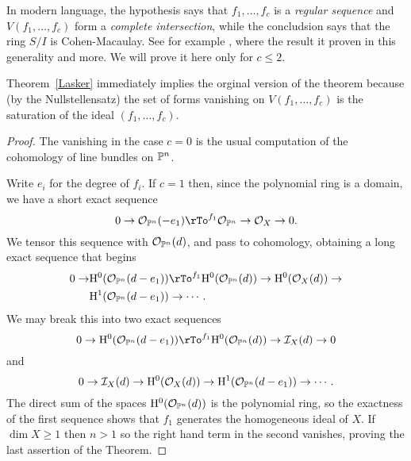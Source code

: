\documentclass[12pt, leqno]{book}
\begin{document}
In modern language, the hypothesis says that $f_{1}, \dots, f_{c}$ is a \emph{regular sequence} and $V(f_{1},\dots,f_{c})$ form a \emph{complete intersection}, while the concludsion says that the ring $S/I$ is Cohen-Macaulay. See for example \cite[Chapter 18]{Eisenbud95}, where the result it proven in this generality and more.
We will prove it here only for $c\leq 2$.

Theorem~\ref{Lasker} immediately implies the orginal version of the theorem because (by the Nullstellensatz) the set of forms vanishing on $V(f_{1}, \dots, f_{c})$ is the saturation 
of the ideal $(f_{1}, \dots, f_{c})$. 

\begin{proof} The vanishing in the case $c=0$ is the usual computation of the cohomology of line bundles on $\PP^{n}$.

Write $e_{i}$ for the degree of $f_{i}$. If $c = 1$ then, since the polynomial ring is a domain, we have a short exact sequence
$$
0\to \cO_{\PP^{n}}(-e_{1}) \rTo^{f_{1}}  \cO_{\PP^{n}} \to  \cO_{X}\to 0.
$$
We tensor this sequence with $\cO_{\PP^{n}}(d)$, and pass to cohomology, obtaining a long exact sequence that begins
\begin{align*}
0\to &\HH^{0}(\cO_{\PP^{n}}(d-e_{1})) \rTo^{f_{1}}  \HH^{0}(\cO_{\PP^{n}}(d)) \to  \HH^{0}(\cO_{X}(d))\to\\
&\HH^{1}(\cO_{\PP^{n}}(d-e_{1}))\to \cdots .
\end{align*}
We may break this into two exact sequences
$$
0\to \HH^{0}(\cO_{\PP^{n}}(d-e_{1})) \rTo^{f_{1}}  \HH^{0}(\cO_{\PP^{n}}(d)) \to \cI_{X}(d) \to 0
$$
and 
$$
0 \to \cI_{X}(d) \to \HH^{0}(\cO_{X}(d))\to\HH^{1}(\cO_{\PP^{n}}(d-e_{1}))\to \cdots .
$$ 
The direct sum of the spaces $\HH^{0}(\cO_{\PP^{n}}(d))$ is the polynomial ring, so the exactness of the first sequence shows that $f_{1}$ generates the homogeneous ideal of $X$. If $\dim X\geq 1$ then $n>1$ so the right hand term in the second  vanishes,
proving the last assertion of the Theorem.


\end{proof}
\end{document}
